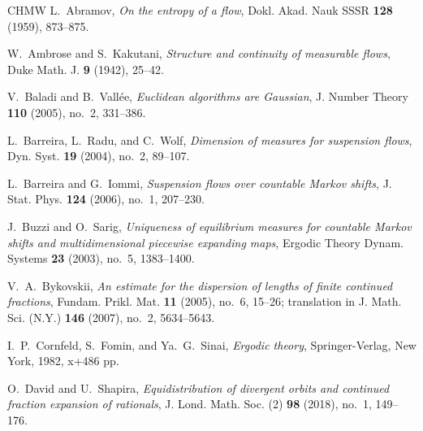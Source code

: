 \documentclass[letterpaper,11pt]{amsart}
\numberwithin{equation}{section}     %
\begin{document}
\begin{thebibliography}{CHMW}
L.~Abramov,
\emph{On the entropy of a flow},
Dokl. Akad. Nauk SSSR \textbf{128} (1959), 873--875.

W.~Ambrose and S.~Kakutani,
\emph{Structure and continuity of measurable flows},
Duke Math. J. \textbf{9} (1942), 25--42.

V.~Baladi and B.~Vall\'ee,
\emph{Euclidean algorithms are Gaussian},
J. Number Theory \textbf{110} (2005), no.~2, 331--386.

L.~Barreira, L.~Radu, and C.~Wolf,
\emph{Dimension of measures for suspension flows},
Dyn. Syst. \textbf{19} (2004), no.~2, 89--107.

L.~Barreira and G.~Iommi,
\emph{Suspension flows over countable Markov shifts},
J. Stat. Phys. \textbf{124} (2006), no.~1, 207--230.

J.~Buzzi and O.~Sarig,
\emph{Uniqueness of equilibrium measures for countable Markov shifts and multidimensional piecewise expanding maps},
Ergodic Theory Dynam. Systems \textbf{23} (2003), no.~5, 1383--1400.

V.~A.~Bykovskii,
\emph{An estimate for the dispersion of lengths of finite continued fractions},
Fundam. Prikl. Mat. \textbf{11} (2005), no.~6, 15--26;
translation in J. Math. Sci. (N.Y.) \textbf{146} (2007), no.~2, 5634--5643.

I.~P.~Cornfeld, S.~Fomin, and Ya.~G.~Sinai,
\emph{Ergodic theory},
Springer-Verlag, New York, 1982, x+486 pp.

O.~David and U.~Shapira,
\emph{Equidistribution of divergent orbits and continued fraction expansion of rationals},
J. Lond. Math. Soc. (2) \textbf{98} (2018), no.~1, 149--176.


\end{thebibliography}
\end{document}
